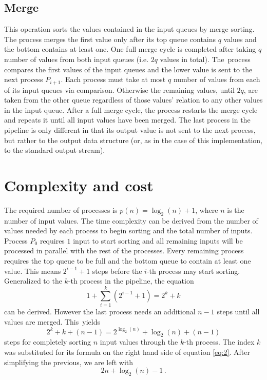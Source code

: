 \documentclass[pdftex, 11pt, a4paper, titlepage]{article}
\begin{document}
        \subsection{Merge} \label{merge}
        This operation sorts the values contained in the input queues by merge sorting. The process merges the first value
        only after its top queue contains $q$ values and the bottom contains at least one. One full merge cycle is completed
        after taking $q$ number of values from both input queues (i.e. $2q$ values in total). The~process compares the first
        values of the input queues and the lower value is sent to the next process $P_{i+1}$. Each process must take
        at most $q$ number of values from each of its input queues via comparison. Otherwise the remaining values, until $2q$,
        are taken from the other queue regardless of those values' relation to any other values in the input queue.
        After a full merge cycle, the process restarts the merge cycle and repeats it until all input values have been merged.
        The last process in the pipeline is only different in that its output value is not sent to the next process, but rather
        to the output data structure (or, as in the case of this implementation, to the standard output stream).

        \section{Complexity and cost}
        The required number of processes is $p(n) = \log_{2}(n)+1$, where $n$ is the number of input values. The time complexity
        can be derived from the number of values needed by each process to begin sorting and the total number of inputs.
        Process $P_0$ requires $1$ input to start sorting and all remaining inputs will be processed in parallel with the rest
        of the processes. Every remaining process requires the top queue to be full and the bottom queue to contain at least one value.
        This means $2^{i-1} + 1$ steps before the $i$-th process may start sorting. Generalized to the $k$-th process in the pipeline,
        the equation
        \begin{equation}\label{eq:1}
            1 + \sum_{i=1}^{k}(2^{i-1}+1) = 2^{k} + k
        \end{equation}
        can be derived. However the last process needs an additional $n-1$ steps until all values are merged. This~yields
        \begin{equation}\label{eq:2}
            2^{k} + k + (n-1) = 2^{\log_{2}(n)} + \log_{2}(n) + (n-1)
        \end{equation}
        steps for completely sorting $n$ input values through the $k$-th process. The index $k$ was substituted for its formula
        on the right hand side of equation \ref{eq:2}. After simplifying the previous, we are left with
        \begin{equation}\label{eq:3}
            2n + \log_{2}(n) - 1\,.
        \end{equation}
\end{document}
